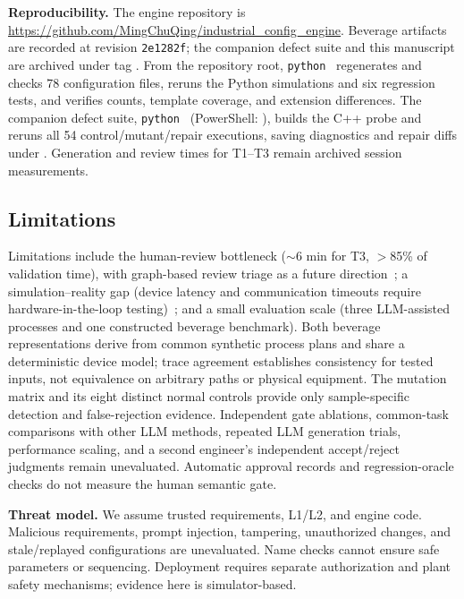 \documentclass[conference]{IEEEtran}
\begin{document}
\textbf{Reproducibility.} The engine repository is \url{https://github.com/MingChuQing/industrial_config_engine}. Beverage artifacts are recorded at revision \texttt{2e1282f}; the companion defect suite and this manuscript are archived under tag . From the repository root, \texttt{python}\  regenerates and checks 78 configuration files, reruns the Python simulations and six regression tests, and verifies counts, template coverage, and extension differences. The companion defect suite, \texttt{python}\  (PowerShell: ), builds the C++ probe and reruns all 54 control/mutant/repair executions, saving diagnostics and repair diffs under . Generation and review times for T1--T3 remain archived session measurements.

\subsection{Limitations}

Limitations include the human-review bottleneck ($\sim$6 min for T3, $>$85\% of validation time), with graph-based review triage as a future direction~\cite{agents4plc}; a simulation--reality gap (device latency and communication timeouts require hardware-in-the-loop testing)~\cite{safeint}; and a small evaluation scale (three LLM-assisted processes and one constructed beverage benchmark). Both beverage representations derive from common synthetic process plans and share a deterministic device model; trace agreement establishes consistency for tested inputs, not equivalence on arbitrary paths or physical equipment. The mutation matrix and its eight distinct normal controls provide only sample-specific detection and false-rejection evidence. Independent gate ablations, common-task comparisons with other LLM methods, repeated LLM generation trials, performance scaling, and a second engineer's independent accept/reject judgments remain unevaluated. Automatic approval records and regression-oracle checks do not measure the human semantic gate.

\textbf{Threat model.} We assume trusted requirements, L1/L2, and engine code. Malicious requirements, prompt injection, tampering, unauthorized changes, and stale/replayed configurations are unevaluated. Name checks cannot ensure safe parameters or sequencing. Deployment requires separate authorization and plant safety mechanisms; evidence here is simulator-based.
\end{document}
